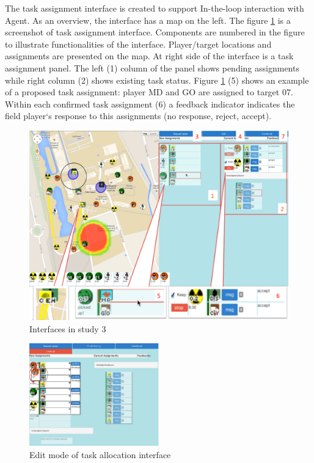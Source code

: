 The task assignment interface is created to support In-the-loop interaction with Agent. As an overview, the interface has a map on the left. The figure \ref{fig:study3TAinterface} is a screenshot of task assignment interface. Components are numbered in the figure to illustrate functionalities of the interface. Player/target locations and assignments are presented on the map. At right side of the interface is a task assignment panel. The left (1) column of the panel shows pending assignments while right column (2) shows existing task status. Figure  \ref{fig:study3TAinterface} (5) shows an example of a proposed task assignment: player MD and GO are assigned to target 07. Within each confirmed task assignment (6) a feedback indicator indicates the field player`s response to this assignments (no response, reject, accept).\\

\begin{figure}[h]
  \centering
  \includegraphics[width=1\textwidth]{img/study3/system/HQ1Interface}
  \caption{Interfaces in study 3}
  \label{fig:study3TAinterface}
\end{figure}

\begin{figure}[h]
  \centering
  \includegraphics[width=0.5\textwidth]{img/study3/system/editmode}
  \caption{Edit mode of task allocation interface}
  \label{fig:study3editmode}
\end{figure}

